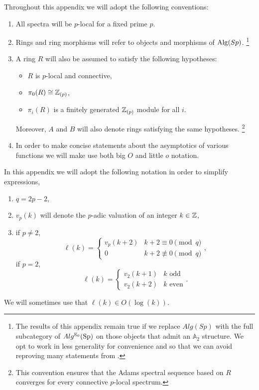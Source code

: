 \begin{cnv} \label{cnv:desc-ring}
  Throughout this appendix we will adopt the following conventions:
  \begin{enumerate}
  \item All spectra will be $p$-local for a fixed prime $p$.
  \item Rings and ring morphisms will refer to objects and morphisms of $\operatorname{\mathrm{Alg}}(Sp)$. \footnote{The results of this appendix remain true if we replace $Alg(Sp)$ with the full subcategory of $Alg^{\mathbb{E}_0}(\operatorname{\mathrm{Sp}})$ on those objects that admit an $\mathbb{A}_2$ structure. We opt to work in less generality for convenience and so that we can avoid reproving many statements from \cite{Akhil}.}
  \item A ring $R$ will also be assumed to satisfy the following hypotheses:
    \begin{itemize}
    \item $R$ is $p$-local and connective,
    \item $\pi_0(R) \cong \mathbb{Z}_{(p)}$,
    \item $\pi_i(R)$ is a finitely generated $\mathbb{Z}_{(p)}$ module for all $i$.
    \end{itemize}
    Moreover, $A$ and $B$ will also denote rings satisfying the same hypotheses. \footnote{This convention ensures that the Adams spectral sequence based on $R$ converges for every connective $p$-local spectrum.}
  \item In order to make concise statements about the asymptotics of various functions we will make use both big $O$ and little $o$ notation. 
  \end{enumerate}
\end{cnv}

\begin{ntn}
  In this appendix we will adopt the following notation in order to simplify expressions,
  \begin{enumerate}
  \item $q = 2p-2$,
  \item $v_p(k)$ will denote the $p$-adic valuation of an integer $k \in \mathbb{Z}$,
  \item if $p \neq 2$, 
    $$ \ell(k) = \begin{cases} v_p(k+2) & k+2 \equiv 0 \pmod q \\ 0 & k+2 \not\equiv 0 \pmod q \end{cases}, $$
    if $p = 2$, 
    $$ \ell(k) = \begin{cases} v_2(k+1) & k \text{ odd} \\ v_2(k+2) & k \text{ even} \end{cases}. $$
  \end{enumerate}
  We will sometimes use that $\ell(k) \in O(\log(k))$.
\end{ntn}

